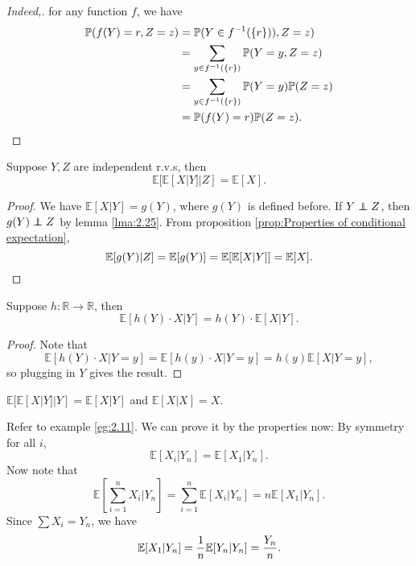 \begin{proof}[Indeed,]
    for any function $f$, we have
    \begin{align*}
        \mathbb{P}(f(Y)=r,Z=z)&= \mathbb{P}(Y\in f^{-1}(\{r\})), Z=z)\\ 
        &= \sum_{y\in f^{-1}(\{r\})} \mathbb{P}(Y=y,Z=z)\\ 
        &= \sum_{y\in f^{-1}(\{r\})} \mathbb{P}(Y=y) \mathbb{P}(Z=z)\\ 
        &= \mathbb{P}(f(Y)=r)\mathbb{P}(Z=z).\qedhere
    \end{align*}
\end{proof}
\begin{proposition}
    Suppose $Y,Z$ are independent r.v.s, then 
    \[
        \mathbb{E}[\mathbb{E}[X|Y]|Z] = \mathbb{E}[X].
    \]
\end{proposition}
\begin{proof}
    We have $ \mathbb{E}[X|Y] = g(Y) $, where $g(Y)$ is defined before. If $ Y \independent Z $, then $ g(Y) \independent Z $ by lemma \ref{lma:2.25}. From proposition \ref{prop:Properties of conditional expectation}, 
    \[
        \mathbb{E}[g(Y)|Z] = \mathbb{E}[g(Y)] = \mathbb{E}[\mathbb{E}[X|Y]] = \mathbb{E}[X].\qedhere
    \]
\end{proof}

\begin{proposition}
    Suppose $h:\mathbb{R}\to\mathbb{R}$, then 
    \[
        \mathbb{E}[h(Y) \cdot X|Y] = h(Y) \cdot \mathbb{E}[X|Y].
    \]
\end{proposition}
\begin{proof}
    Note that 
    \[
        \mathbb{E}[h(Y)\cdot X|Y=y]=\mathbb{E}[h(y)\cdot X|Y=y] = h(y)\mathbb{E}[X|Y=y],
    \]
    so plugging in $Y$ gives the result.
\end{proof}
\begin{corollary}
    $ \mathbb{E}[\mathbb{E}[X|Y]|Y]=\mathbb{E}[X|Y] $ and $ \mathbb{E}[X|X]=X $.
\end{corollary}

\begin{example}
    Refer to example \ref{eg:2.11}. We can prove it by the properties now: By symmetry for all $i$, 
    \[
        \mathbb{E}[X_i|Y_n]=\mathbb{E}[X_1|Y_n].
    \]
    Now note that 
    \[
        \mathbb{E}\left[ \sum_{i=1}^{n}X_i\Big|Y_n \right] = \sum_{i=1}^{n}\mathbb{E}[X_i|Y_n] = n \mathbb{E}[X_1|Y_n].
    \]
    Since $ \sum X_i = Y_n $, we have 
    \[
        \mathbb{E}[X_1|Y_n] = \frac{1}{n}\mathbb{E}[Y_n|Y_n] = \frac{Y_n}{n}.\qedhere
    \]
\end{example}

